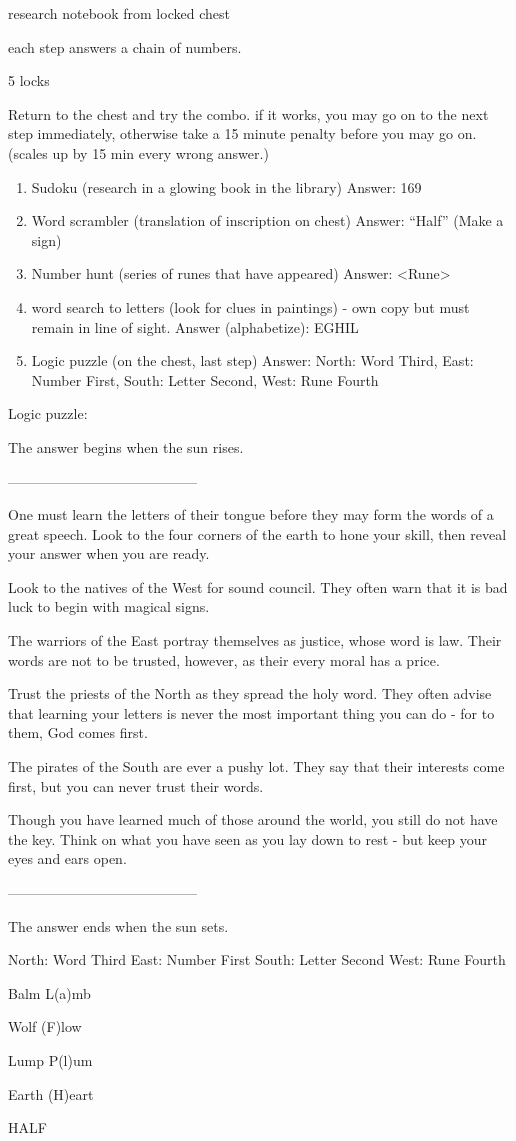 \documentclass[green]{NeptuneBall}
\begin{document}
\name{\gGlowShell{}}

research notebook from locked chest

each step answers a chain of numbers.

5 locks

Return to the chest and try the combo. if it works, you may go on to the next step immediately, otherwise take a 15 minute penalty before you may go on. (scales up by 15 min every wrong answer.)

\begin{enumerate}
\item Sudoku  (research in a glowing book in the library) Answer: 169
\item Word scrambler  (translation of inscription on chest) Answer: ``Half'' (Make a sign)
\item Number hunt  (series of runes that have appeared) Answer: <Rune>
\item word search to letters  (look for clues in paintings) - own copy but must remain in line of sight. Answer (alphabetize): EGHIL
\item Logic puzzle  (on the chest, last step) Answer: North: Word Third, East: Number First, South: Letter Second, West: Rune Fourth
\end{enumerate}


Logic puzzle:

The answer begins when the sun rises. 

-----------------------------------------

One must learn the letters of their tongue before they may form the words of a great speech. Look to the four corners of the earth to hone your skill, then reveal your answer when you are ready.

Look to the natives of the West for sound council. They often warn that it is bad luck to begin with magical signs.

The warriors of the East portray themselves as justice, whose word is law. Their words are not to be trusted, however, as their every moral has a price.

Trust the priests of the North as they spread the holy word. They often advise that learning your letters is never the most important thing you can do - for to them, God comes first.

The pirates of the South are ever a pushy lot. They say that their interests come first, but you can never trust their words.

Though you have learned much of those around the world, you still do not have the key. Think on what you have seen as you lay down to rest - but keep your eyes and ears open.

-----------------------------------------

The answer ends when the sun sets.




North: Word Third
East: Number First
South: Letter Second
West: Rune Fourth



Balm
L(a)mb

Wolf
(F)low

Lump
P(l)um

Earth
(H)eart

HALF
\end{document}
